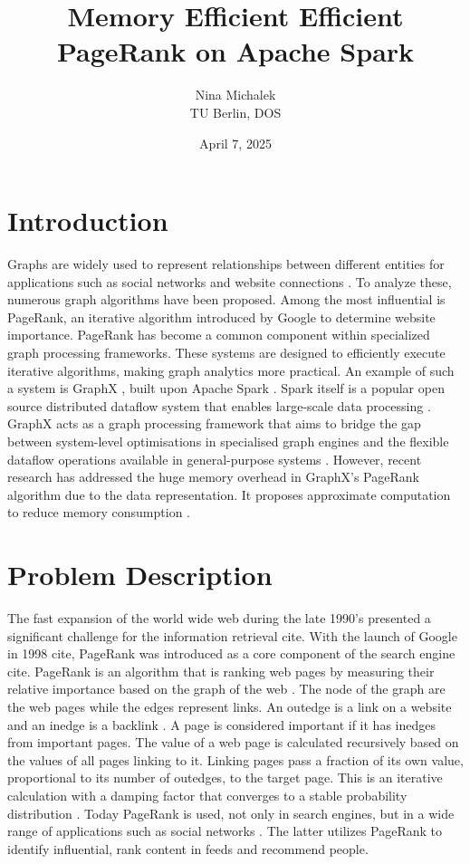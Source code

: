 \documentclass[a4paper,12pt]{article}
\title{Memory Efficient Efficient PageRank on Apache Spark}
\author{Nina Michalek\\TU Berlin, DOS}
\date{April 7, 2025}
\begin{document}
\maketitle


\section{Introduction}
 Graphs are widely used to represent relationships between different entities for applications such as social networks and website connections \cite{zhang_distributed_2021}. 
To analyze these, numerous graph algorithms have been proposed. Among the most influential is PageRank, an iterative algorithm introduced by Google to determine website importance. PageRank has become a common component within specialized graph processing frameworks. These systems are designed to efficiently execute iterative algorithms, making graph analytics more practical. An example of such a system is GraphX \cite{xin_graphx_2013}, built upon Apache Spark \cite{xin_graphx_2013}. Spark itself is a popular open source distributed dataflow system that enables large-scale data processing \cite{shanahan_large_2015}. GraphX acts as a graph processing framework that aims to bridge the gap between system-level optimisations in specialised graph engines and the flexible dataflow operations available in general-purpose systems \cite{jin_software_2022}. However, recent research has addressed the huge memory overhead in GraphX's PageRank algorithm due to the data representation. It proposes approximate computation to reduce memory consumption \cite{wu_efficient_2024}. 
 

\section{Problem Description}
The fast expansion of the world wide web during the late 1990's presented a significant challenge for the information retrieval cite. With the launch of Google in 1998 cite, PageRank was introduced as a core component of the search engine cite. PageRank is an algorithm that is ranking web pages by measuring their relative importance based on the graph of the web \cite{page_pagerank_1999}. The node of the graph are the web pages while the edges represent links. An outedge is a link on a website and an inedge is a backlink \cite{page_pagerank_1999}. A page is considered important if it has inedges from important pages. The value of a web page is calculated recursively based on the values of all pages linking to it. Linking pages pass a fraction of its own value, proportional to its number of outedges, to the target page. This is an iterative calculation with a damping factor that converges to a stable probability distribution \cite{page_pagerank_1999}. 
Today PageRank is used, not only in search engines, but in a wide range of applications such as social networks \cite{wu_efficient_2024}. The latter utilizes PageRank to identify influential, rank content in feeds and recommend people.
\end{document}
